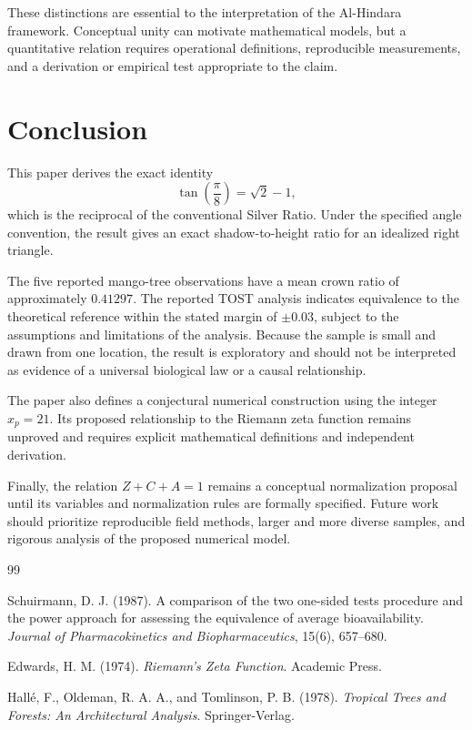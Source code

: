 \documentclass[11pt,a4paper]{article}
\begin{document}
These distinctions are essential to the interpretation of
the Al-Hindara framework. Conceptual unity can motivate
mathematical models, but a quantitative relation requires
operational definitions, reproducible measurements, and
a derivation or empirical test appropriate to the claim.

\section{Conclusion}

This paper derives the exact identity
\[
    \tan\left(\frac{\pi}{8}\right)=\sqrt{2}-1,
\]
which is the reciprocal of the conventional Silver Ratio.
Under the specified angle convention, the result gives an
exact shadow-to-height ratio for an idealized right triangle.

The five reported mango-tree observations have a mean crown
ratio of approximately \(0.41297\). The reported TOST analysis
indicates equivalence to the theoretical reference within
the stated margin of \(\pm0.03\), subject to the assumptions
and limitations of the analysis. Because the sample is
small and drawn from one location, the result is exploratory
and should not be interpreted as evidence of a universal
biological law or a causal relationship.

The paper also defines a conjectural numerical construction
using the integer \(x_p=21\). Its proposed relationship to the
Riemann zeta function remains unproved and requires explicit
mathematical definitions and independent derivation.

Finally, the relation \(Z+C+A=1\) remains a conceptual
normalization proposal until its variables and normalization
rules are formally specified. Future work should prioritize
reproducible field methods, larger and more diverse samples,
and rigorous analysis of the proposed numerical model.

\begin{thebibliography}{99}

Schuirmann, D. J. (1987).
A comparison of the two one-sided tests procedure and the
power approach for assessing the equivalence of average
bioavailability.
\textit{Journal of Pharmacokinetics and Biopharmaceutics},
15(6), 657--680.

Edwards, H. M. (1974).
\textit{Riemann's Zeta Function}.
Academic Press.

Hall\'e, F., Oldeman, R. A. A., and Tomlinson, P. B. (1978).
\textit{Tropical Trees and Forests: An Architectural Analysis}.
Springer-Verlag.

\end{thebibliography}
\end{document}
